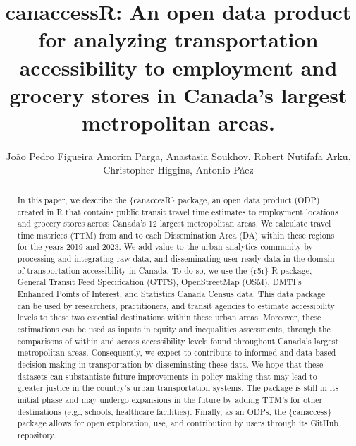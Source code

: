 \documentclass[Royal,times,sageh]{sagej}
\begin{document}

\title{canaccessR: An open data product for analyzing transportation
accessibility to employment and grocery stores in Canada's largest
metropolitan areas.}

\runninghead{}

\author{João Pedro Figueira Amorim Parga\affilnum{}, Anastasia
Soukhov\affilnum{}, Robert Nutifafa Arku\affilnum{}, Christopher
Higgins\affilnum{}, Antonio Páez\affilnum{}}

\affiliation{}



\begin{abstract}
In this paper, we describe the \{canaccesR\} package, an open data
product (ODP) created in R that contains public transit travel time
estimates to employment locations and grocery stores across Canada's 12
largest metropolitan areas. We calculate travel time matrices (TTM) from
and to each Dissemination Area (DA) within these regions for the years
2019 and 2023. We add value to the urban analytics community by
processing and integrating raw data, and disseminating user-ready data
in the domain of transportation accessibility in Canada. To do so, we
use the \{r5r\} R package, General Transit Feed Specification (GTFS),
OpenStreetMap (OSM), DMTI's Enhanced Points of Interest, and Statistics
Canada Census data. This data package can be used by researchers,
practitioners, and transit agencies to estimate accessibility levels to
these two essential destinations within these urban areas. Moreover,
these estimations can be used as inputs in equity and inequalities
assessments, through the comparisons of within and across accessibility
levels found throughout Canada's largest metropolitan areas.
Consequently, we expect to contribute to informed and data-based
decision making in transportation by disseminating these data. We hope
that these datasets can substantiate future improvements in
policy-making that may lead to greater justice in the country's urban
transportation systems. The package is still in its initial phase and
may undergo expansions in the future by adding TTM's for other
destinations (e.g., schools, healthcare facilities). Finally, as an
ODPs, the \{canaccess\} package allows for open exploration, use, and
contribution by users through its GitHub repository.
\end{abstract}

\end{document}
